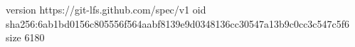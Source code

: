 version https://git-lfs.github.com/spec/v1
oid sha256:6ab1bd0156c805556f564aabf8139e9d0348136cc30547a13b9c0cc3c547c5f6
size 6180
